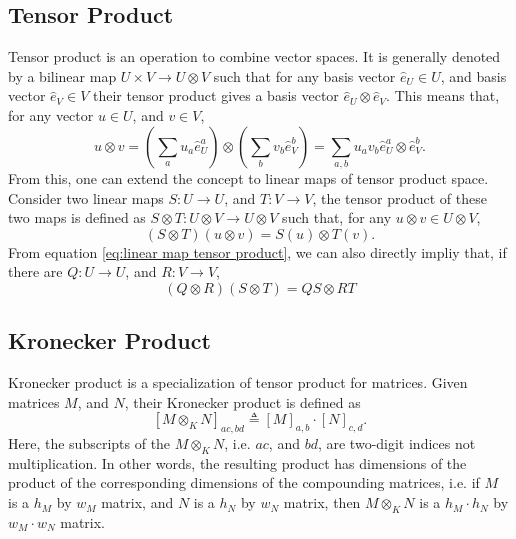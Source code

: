 \documentclass[preprint, 12pt]{revtex4-2}
\numberwithin{equation}{section}
\begin{document}
\subsection{Tensor Product}
Tensor product is an operation to combine vector spaces. It is generally denoted by a bilinear map $U\times V\rightarrow U\otimes V$ such that for any basis vector $\hat{e}_U\in U$, and basis vector $\hat{e}_V\in V$ their tensor product gives a basis vector $\hat{e}_U\otimes \hat{e}_V$. This means that, for any vector $u\in U$, and $v\in V$,
\begin{equation}\label{eq:vector tensor product}
    u\otimes v = \left(\sum_{a}u_a\hat{e}_U^a\right)\otimes\left(\sum_{b}v_b\hat{e}_V^b\right) = \sum_{a,b}u_av_b\hat{e}_U^a\otimes\hat{e}_V^b.
\end{equation}
From this, one can extend the concept to linear maps of tensor product space. Consider two linear maps $S:U\rightarrow U$, and $T:V\rightarrow V$, the tensor product of these two maps is defined as $S\otimes T:U\otimes V\rightarrow U\otimes V$ such that, for any $u\otimes v\in U\otimes V$,
\begin{equation}\label{eq:linear map tensor product}
    (S\otimes T)(u\otimes v) = S(u)\otimes T(v).
\end{equation}
From equation \ref{eq:linear map tensor product}, we can also directly impliy that, if there are $Q:U\rightarrow U$, and $R:V\rightarrow V$,
\begin{equation}\label{eq:compose linear map tensor product}
    (Q\otimes R)(S\otimes T) = QS\otimes RT
\end{equation}

\subsection{Kronecker Product}
Kronecker product is a specialization of tensor product for matrices. Given matrices $M$, and $N$, their Kronecker product is defined as
\begin{equation}\label{eq:Kronecker product}
    \left[M\otimes_KN\right]_{ac,bd} \triangleq \left[M\right]_{a,b}\cdot\left[N\right]_{c,d}.
\end{equation}
Here, the subscripts of the $M\otimes_KN$, i.e. $ac$, and $bd$, are two-digit indices not multiplication. In other words, the resulting product has dimensions of the product of the corresponding dimensions of the compounding matrices, i.e. if $M$ is a $h_M$ by $w_M$ matrix, and $N$ is a $h_N$ by $w_N$ matrix, then $M\otimes_KN$ is a $h_M\cdot h_N$ by $w_M\cdot w_N$ matrix.
\end{document}
